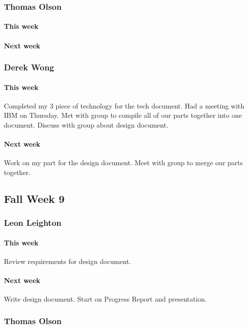 \documentclass[10pt,letterpaper,onecolumn,draftclsnofoot]{IEEEtran}
\begin{document}
\subsubsection{Thomas Olson}
\paragraph{This week}
\paragraph{Next week}

\subsubsection{Derek Wong}
\paragraph{This week}Completed my 3 piece of technology for the tech document.                     
Had a meeting with IBM on Thursday.               
Met with group to compile all of our parts together into one document.                
Discuss with group about design document.
\paragraph{Next week}Work on my part for the design document.                       
Meet with group to merge our parts together.

\subsection{Fall Week 9}
\subsubsection{Leon Leighton}
\paragraph{This week}Review requirements for design document.
\paragraph{Next week}Write design document. Start on Progress Report and presentation.

\subsubsection{Thomas Olson}
\end{document}
